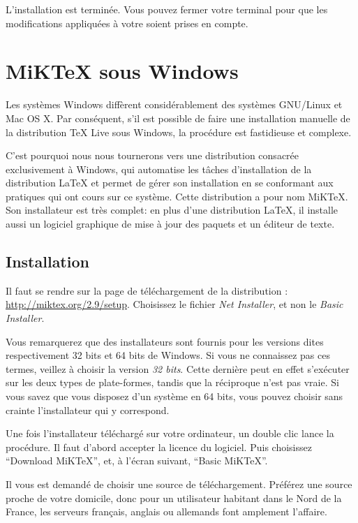 L'installation est terminée. Vous pouvez fermer votre terminal pour que les modifications appliquées à votre  soient prises en compte. 


\section{MiKTeX sous Windows}


Les systèmes Windows diffèrent considérablement des systèmes GNU/Linux et Mac OS X. Par conséquent, s'il est possible de faire une installation manuelle de la distribution TeX Live sous Windows, la procédure est fastidieuse et complexe.

C'est pourquoi nous nous tournerons vers une distribution consacrée exclusivement à Windows, qui automatise les tâches d'installation de la distribution \LaTeX{} et permet de gérer son installation en se conformant aux pratiques qui ont cours sur ce système. Cette distribution a pour nom MiKTeX. Son installateur est très complet: en plus d'une distribution \LaTeX{}, il installe aussi un logiciel graphique de mise à jour des paquets et un éditeur de texte.

\subsection{Installation}

Il faut se rendre sur la page de téléchargement de la distribution : \url{http://miktex.org/2.9/setup}. Choisissez le fichier \emph{Net Installer}, et non le \emph{Basic Installer}.

\begin{attention}
Vous remarquerez que des installateurs sont fournis pour les versions dites respectivement 32 bits et 64 bits de Windows. Si vous ne connaissez pas ces termes, veillez à choisir la version \emph{32 bits}. Cette dernière peut en effet s'exécuter sur les deux types de plate-formes, tandis que la réciproque n'est pas vraie. Si vous savez que vous disposez d'un système en 64 bits, vous pouvez choisir sans crainte l'installateur qui y correspond.
\end{attention}

Une fois l'installateur téléchargé sur votre ordinateur, un double clic lance la procédure. Il faut d'abord accepter la licence du logiciel. Puis choisissez \enquote{Download MiKTeX}, et, à l'écran suivant, \enquote{Basic MiKTeX}.

Il vous est demandé de choisir une source de téléchargement. Préférez une source proche de votre domicile, donc pour un utilisateur habitant dans le Nord de la France, les serveurs français, anglais ou allemands font amplement l'affaire.


